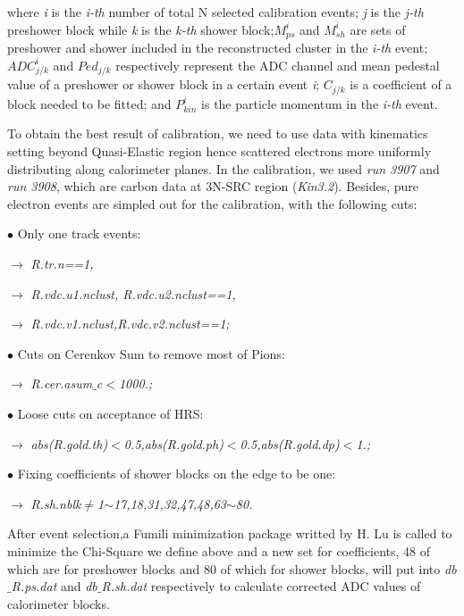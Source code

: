 where \emph{i} is the \emph{i-th} number of total N selected calibration events; \emph{j} is the \emph{j-th} preshower block while \emph{k} is the \emph{k-th} shower block;$M_{ps}^{i}$ and $M_{sh}^{i}$ are sets of preshower and shower included in the reconstructed cluster in the \emph{i-th} event; $ADC_{j/k}^{i}$ and $Ped_{j/k}$ respectively represent the ADC channel and mean pedestal value of a preshower or shower block in a certain event \emph{i}; $C_{j/k}$ is a coefficient of a block needed to be fitted; and $P_{kin}^{i}$ is the particle momentum in the \emph{i-th} event.

 To obtain the best result of calibration, we need to use data with kinematics setting beyond Quasi-Elastic region hence scattered electrons more uniformly distributing along calorimeter planes. In the calibration, we used \emph{run 3907} and \emph{run 3908}, which are carbon data at 3N-SRC region (\emph{Kin3.2}). Besides, pure electron events are simpled out for the calibration, with the following cuts:

  $\bullet$ Only one track events:

    $\rightarrow$ \emph{R.tr.n==1,}

    $\rightarrow$ \emph{R.vdc.u1.nclust, R.vdc.u2.nclust==1,}

    $\rightarrow$ \emph{R.vdc.v1.nclust,R.vdc.v2.nclust==1;}

  $\bullet$  Cuts on Cerenkov Sum to remove most of Pions: 

    $\rightarrow$ \emph{R.cer.asum$\_$c$<$1000.;}

  $\bullet$  Loose cuts on acceptance of HRS:  

    $\rightarrow$ \emph{abs(R.gold.th)$<$0.5,abs(R.gold.ph)$<$0.5,abs(R.gold.dp)$<$1.;}

  $\bullet$  Fixing coefficients of shower blocks on the edge to be one: 

    $\rightarrow$ \emph{R.sh.nblk$\neq$1$\sim$17,18,31,32,47,48,63$\sim$80.}

  After event selection,a Fumili minimization package writted by H. Lu \cite{shower_luhj} is called to minimize the Chi-Square we define above and a new set for coefficients, 48 of which are for preshower blocks and 80 of which for shower blocks, will put into \emph{db$\_$R.ps.dat} and \emph{db$\_$R.sh.dat} respectively to calculate corrected ADC values of calorimeter blocks.

